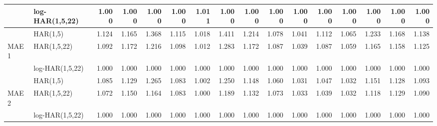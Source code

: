 \begin{table}[ht]
{\begin{tabular}{llrrrrrrrrrrrrrr}
   & log-HAR(1,5,22) & 1.000 & 1.000 & 1.000 & 1.000 & 1.011 & 1.000 & 1.000 & 1.000 & 1.000 & 1.000 & 1.000 & 1.000 & 1.000 & 1.000 \\ 
   \hline
 & HAR(1,5) & 1.124 & 1.165 & 1.368 & 1.115 & 1.018 & 1.411 & 1.214 & 1.078 & 1.041 & 1.112 & 1.065 & 1.233 & 1.168 & 1.138 \\ 
  MAE1 & HAR(1,5,22) & 1.092 & 1.172 & 1.216 & 1.098 & 1.012 & 1.283 & 1.172 & 1.087 & 1.039 & 1.087 & 1.059 & 1.165 & 1.158 & 1.125 \\ 
   & log-HAR(1,5,22) & 1.000 & 1.000 & 1.000 & 1.000 & 1.000 & 1.000 & 1.000 & 1.000 & 1.000 & 1.000 & 1.000 & 1.000 & 1.000 & 1.000 \\ 
   \hline
 & HAR(1,5) & 1.085 & 1.129 & 1.265 & 1.083 & 1.002 & 1.250 & 1.148 & 1.060 & 1.031 & 1.047 & 1.032 & 1.151 & 1.128 & 1.093 \\ 
  MAE2 & HAR(1,5,22) & 1.072 & 1.150 & 1.164 & 1.083 & 1.000 & 1.189 & 1.132 & 1.073 & 1.033 & 1.039 & 1.032 & 1.118 & 1.129 & 1.090 \\ 
   & log-HAR(1,5,22) & 1.000 & 1.000 & 1.000 & 1.000 & 1.000 & 1.000 & 1.000 & 1.000 & 1.000 & 1.000 & 1.000 & 1.000 & 1.000 & 1.000 \\ 
   \hline
\end{tabular}
}
\end{table}
